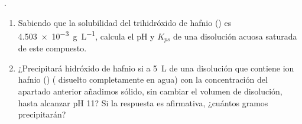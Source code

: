 .\begin{enumerate}[label={\alph*)},font={\color{red!50!black}\bfseries}]
	\item Sabiendo que la solubilidad del trihidróxido de hafnio () es \SI{4,503e-3}{\gram\per\liter}, calcula el pH y $K_{ps}$ de una disolución acuosa saturada de este compuesto.
	\item ¿Precipitará hidróxido de hafnio si a \SI{5}{\liter} de una disolución que contiene ion hafnio () ( disuelto completamente en agua) con la concentración del apartado anterior añadimos  sólido, sin cambiar el volumen de disolución, hasta alcanzar pH \num{11}? Si la respuesta es afirmativa, ¿cuántos gramos precipitarán?
\end{enumerate}

